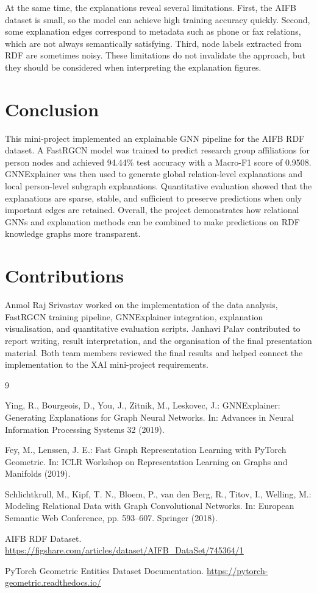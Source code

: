 \documentclass[10pt,a4paper]{article}
\begin{document}
At the same time, the explanations reveal several limitations. First, the AIFB
dataset is small, so the model can achieve high training accuracy quickly.
Second, some explanation edges correspond to metadata such as phone or fax
relations, which are not always semantically satisfying. Third, node labels
extracted from RDF are sometimes noisy. These limitations do not invalidate the
approach, but they should be considered when interpreting the explanation
figures.

\section{Conclusion}
This mini-project implemented an explainable GNN pipeline for the AIFB RDF
dataset. A FastRGCN model was trained to predict research group affiliations
for person nodes and achieved 94.44\% test accuracy with a Macro-F1 score of
0.9508. GNNExplainer was then used to generate global relation-level
explanations and local person-level subgraph explanations. Quantitative
evaluation showed that the explanations are sparse, stable, and sufficient to
preserve predictions when only important edges are retained. Overall, the
project demonstrates how relational GNNs and explanation methods can be
combined to make predictions on RDF knowledge graphs more transparent.

\section{Contributions}
Anmol Raj Srivastav worked on the implementation of the data analysis,
FastRGCN training pipeline, GNNExplainer integration, explanation
visualisation, and quantitative evaluation scripts. Janhavi Palav contributed to
report writing, result interpretation, and the organisation of the final
presentation material. Both team members reviewed the final results and helped
connect the implementation to the XAI mini-project requirements.

\begin{thebibliography}{9}

Ying, R., Bourgeois, D., You, J., Zitnik, M., Leskovec, J.:
GNNExplainer: Generating Explanations for Graph Neural Networks.
In: Advances in Neural Information Processing Systems 32 (2019).

Fey, M., Lenssen, J. E.:
Fast Graph Representation Learning with PyTorch Geometric.
In: ICLR Workshop on Representation Learning on Graphs and Manifolds (2019).

Schlichtkrull, M., Kipf, T. N., Bloem, P., van den Berg, R.,
Titov, I., Welling, M.:
Modeling Relational Data with Graph Convolutional Networks.
In: European Semantic Web Conference, pp. 593--607. Springer (2018).

AIFB RDF Dataset.
\url{https://figshare.com/articles/dataset/AIFB_DataSet/745364/1}

PyTorch Geometric Entities Dataset Documentation.
\url{https://pytorch-geometric.readthedocs.io/}

\end{thebibliography}
\end{document}
